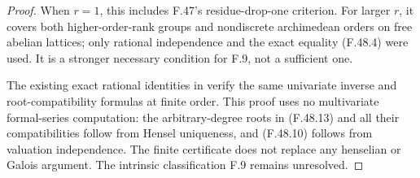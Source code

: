 \begin{proof}
When \(r=1\), this includes F.47's residue-drop-one criterion. For larger \(r\), it covers both higher-order-rank groups and nondiscrete archimedean orders on free abelian lattices; only rational independence and the exact equality (F.48.4) were used. It is a stronger necessary condition for F.9, not a sufficient one.

The existing exact rational identities in
 verify the same univariate inverse and
root-compatibility formulas at finite order. This proof uses no
multivariate formal-series computation: the arbitrary-degree roots in
(F.48.13) and all their compatibilities follow from Hensel uniqueness,
and (F.48.10) follows from valuation independence. The finite
certificate does not replace any henselian or Galois argument.
The intrinsic classification F.9 remains unresolved.

\end{proof}
